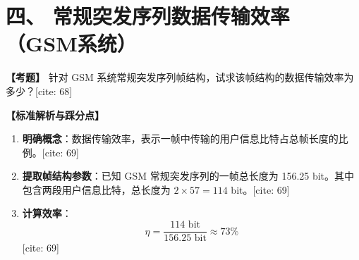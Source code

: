 \documentclass[12pt, a4paper]{ctexart}
\begin{document}
	\vspace{1.5em}

	\section*{四、 常规突发序列数据传输效率（GSM系统）}

	\textbf{【考题】}
	针对 GSM 系统常规突发序列帧结构，试求该帧结构的数据传输效率为多少？[cite: 68]

	\vspace{0.5em}
	\noindent\textbf{【标准解析与踩分点】}
	\begin{enumerate}[label=\arabic*.]
		\item \textbf{明确概念}：数据传输效率，表示一帧中传输的用户信息比特占总帧长度的比例。[cite: 69]
		\item \textbf{提取帧结构参数}：已知 GSM 常规突发序列的一帧总长度为 156.25 bit。其中包含两段用户信息比特，总长度为 $2 \times 57 = 114$ bit。[cite: 69]
		\item \textbf{计算效率}：
		$$ \eta = \frac{114 \text{ bit}}{156.25 \text{ bit}} \approx 73\% $$ [cite: 69]
	\end{enumerate}
\end{document}
